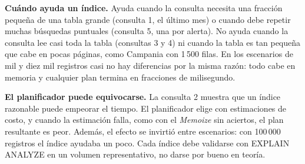 \documentclass[11pt,letterpaper]{article}
\newcommand{\tbus}{\textunderscore\allowbreak}
\newcommand{\tb}[1]{{\ttfamily\let\_\tbus #1}}
\begin{document}
\begin{table}[H]
\centering\small
{}
\caption{Método de acceso a la tabla principal de cada consulta (PostgreSQL 16). C1 y C3: lecturas; C2 y C5: riegos; C4: cosechas.}\label{tab:planes}
\end{table}


\textbf{Cuándo ayuda un índice.} Ayuda cuando la consulta necesita una fracción pequeña de una tabla grande (consulta 1, el último mes) o cuando debe repetir muchas búsquedas puntuales (consulta 5, una por alerta). No ayuda cuando la consulta lee casi toda la tabla (consultas 3 y 4) ni cuando la tabla es tan pequeña que cabe en pocas páginas, como \tb{Campania} con 1\,500 filas. En los escenarios de mil y diez mil registros casi no hay diferencias por la misma razón: todo cabe en memoria y cualquier plan termina en fracciones de milisegundo.

\textbf{El planificador puede equivocarse.} La consulta 2 muestra que un índice razonable puede empeorar el tiempo. El planificador elige con estimaciones de costo, y cuando la estimación falla, como con el \emph{Memoize} sin aciertos, el plan resultante es peor. Además, el efecto se invirtió entre escenarios: con 100\,000 registros el índice ayudaba un poco. Cada índice debe validarse con \tb{EXPLAIN ANALYZE} en un volumen representativo, no darse por bueno en teoría.
\end{document}
